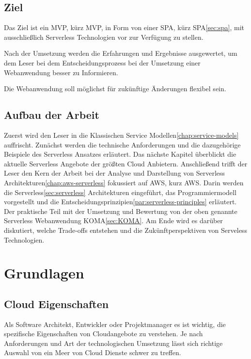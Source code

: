 \documentclass[
12pt,
english,
ngerman,
headsepline,
twoside,
openright,
numbers=noenddot,version=first
]{scrreprt}
\begin{document}
\section{Ziel}
\label{sec:task}
Das Ziel ist ein \acrfull{MVP}, kürz \acrshort{MVP}, in Form von einer \acrfull{SPA}, kürz \acrshort{SPA}\ref{sec:spa}, mit ausschließlich Serverless Technologien vor zur Verfügung zu stellen.

Nach der Umsetzung werden die Erfahrungen und Ergebnisse ausgewertet, um dem Leser bei dem Entscheidungsprozess bei der Umsetzung einer Webanwendung besser zu Informieren.

Die Webanwendung soll möglichst für zukünftige Änderungen flexibel sein.

\section{Aufbau der Arbeit}
\label{sec:layout}

Zuerst wird den Leser in die Klassischen Service Modellen\ref{chap:service-models} auffrischt. Zunächst werden die technische Anforderungen und die dazugehörige Beispiele des Serverless Ansatzes erläutert.
Das nächste Kapitel überblickt die aktuelle Serverless Angebote der größten Cloud Anbietern.
Anschließend trifft der Leser den Kern der Arbeit bei der Analyse und Darstellung von Serverless Architekturen\ref{chap:aws-serverless} fokussiert auf \acrfull{AWS}, kurz \acrshort{AWS}. Darin werden die Serverless\ref{sec:serverless} Architekturen eingeführt, das Programmiermodell vorgestellt und die Entscheidungsprinzipien\ref{par:serverless-principles} erläutert.
Der praktische Teil mit der Umsetzung und Bewertung von der oben genannte Serverless Webanwendung KOMA\ref{sec:KOMA}.
Am Ende wird es darüber diskutiert, welche Trade-offs entstehen und die Zukünftperspektiven von Serveless Technologien.

\chapter{Grundlagen}
\label{chap:principles}
\section{Cloud Eigenschaften}
\label{sec:cloud-char}
Als Software Architekt, Entwickler oder Projektmanager es ist wichtig, die spezifische Eigenschaften von Cloudangebote zu verstehen. Je nach Anforderungen und Art der technologischen Umsetzung lässt sich richtige Auswahl von ein Meer von Cloud Dienste schwer zu treffen. 
\end{document}
